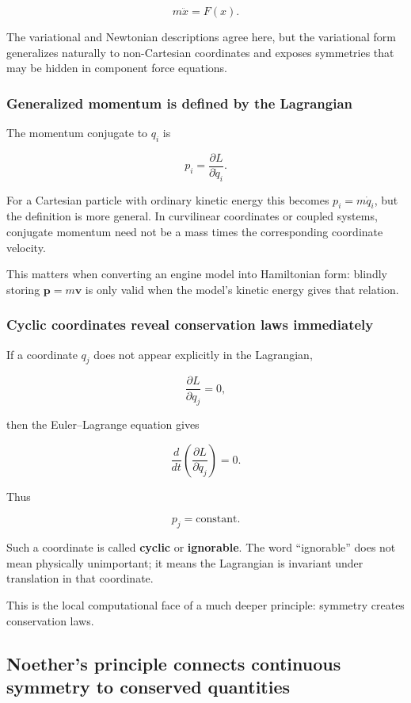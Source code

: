 \[
m\ddot x=F(x).
\]

The variational and Newtonian descriptions agree here, but the variational form generalizes naturally to non-Cartesian coordinates and exposes symmetries that may be hidden in component force equations.

\subsubsection{Generalized momentum is defined by the Lagrangian}\label{02-foundations-ii-ch025-generalized-momentum-is-defined-by-the-lagrangian}

The momentum conjugate to \(q_i\) is

\[
\boxed{
p_i
=
\frac{\partial L}{\partial\dot q_i}
}.
\]

For a Cartesian particle with ordinary kinetic energy this becomes \(p_i=m\dot q_i\), but the definition is more general. In curvilinear coordinates or coupled systems, conjugate momentum need not be a mass times the corresponding coordinate velocity.

This matters when converting an engine model into Hamiltonian form: blindly storing \(\mathbf p=m\mathbf v\) is only valid when the model's kinetic energy gives that relation.

\subsubsection{Cyclic coordinates reveal conservation laws immediately}\label{02-foundations-ii-ch025-cyclic-coordinates-reveal-conservation-laws-immediately}

If a coordinate \(q_j\) does not appear explicitly in the Lagrangian,

\[
\frac{\partial L}{\partial q_j}=0,
\]

then the Euler--Lagrange equation gives

\[
\frac{d}{dt}
\left(
\frac{\partial L}{\partial\dot q_j}
\right)
=0.
\]

Thus

\[
\boxed{p_j=\text{constant}.}
\]

Such a coordinate is called \textbf{cyclic} or \textbf{ignorable}. The word ``ignorable'' does not mean physically unimportant; it means the Lagrangian is invariant under translation in that coordinate.

This is the local computational face of a much deeper principle: symmetry creates conservation laws.

\subsection{Noether's principle connects continuous symmetry to conserved quantities}\label{02-foundations-ii-ch025-noethers-principle-connects-continuous-symmetry-to-conserved-quantities}

